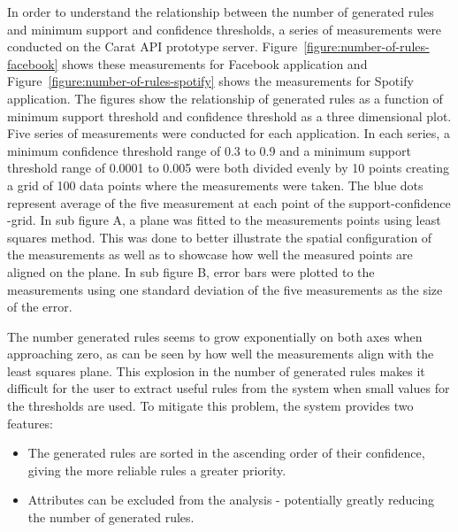 In order to understand the relationship between the number of generated rules and minimum support and confidence thresholds, a series of measurements were conducted on the Carat API prototype server. Figure~\ref{figure:number-of-rules-facebook} shows these  measurements for Facebook application and Figure~\ref{figure:number-of-rules-spotify} shows the measurements for Spotify application. The figures show the relationship of generated rules as a function of minimum support threshold and confidence threshold as a three dimensional plot. Five series of measurements were conducted for each application. In each series, a minimum confidence threshold range of 0.3 to 0.9 and a minimum support threshold range of 0.0001 to 0.005 were both divided evenly by 10 points creating a grid of 100 data points where the measurements were taken. The blue dots represent average of the five measurement at each point of the support-confidence -grid. In sub figure A, a plane was fitted to the measurements points using least squares method. This was done to better illustrate the spatial configuration of the measurements as well as to showcase how well the measured points are aligned on the plane. In sub figure B, error bars were plotted to the measurements using one standard deviation of the five measurements as the size of the error. 


The number generated rules seems to grow exponentially on both axes when approaching zero, as can be seen by how well the measurements align with the least squares plane. This explosion in the number of generated rules makes it difficult for the user to extract useful rules from the system when small values for the thresholds are used. To mitigate this problem, the system provides two features:

\begin{itemize}
	\item The generated rules are sorted in the ascending order of their confidence, giving the more reliable rules a greater priority.    
         
	\item Attributes can be excluded from the analysis - potentially greatly reducing the number of generated rules. 
\end{itemize}        

